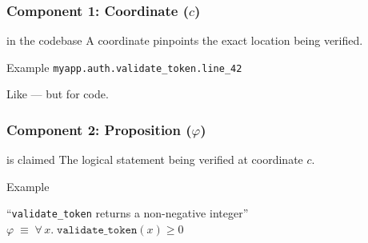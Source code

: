\begin{frame}
\frametitle{Component 1: Coordinate ($c$)}
\begin{block}{ in the codebase}
  A coordinate pinpoints the exact location being verified.
\end{block}
\vspace{6pt}
\begin{exampleblock}{Example}
  \texttt{myapp.auth.validate\_token.line\_42}
\end{exampleblock}
\vspace{6pt}
\begin{center}
\end{center}
\vspace{6pt}
\begin{center}
  {\small Like  --- but for code.}
\end{center}
\end{frame}

\begin{frame}
\frametitle{Component 2: Proposition ($\varphi$)}
\begin{block}{ is claimed}
  The logical statement being verified at coordinate $c$.
\end{block}
\vspace{8pt}
\begin{exampleblock}{Example}
  \begin{center}
    ``\texttt{validate\_token} returns a non-negative integer''\\[6pt]
    $\varphi \;\equiv\; \forall\, x.\;\texttt{validate\_token}(x) \geq 0$
  \end{center}
\end{exampleblock}
\vspace{8pt}
\begin{center}
\end{center}
\end{frame}

